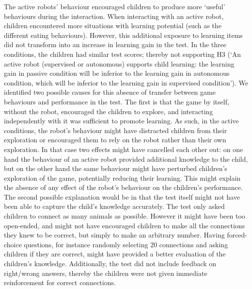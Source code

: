 The active robots' behaviour encouraged children to produce more `useful' behaviours during the interaction. When interacting with an active robot, children encountered more situations with learning potential (such as the different eating behaviours). However, this additional exposure to learning items did not transform into an increase in learning gain in the test. In the three conditions, the children had similar test scores; thereby not supporting H3 (`An active robot (supervised or autonomous) supports child learning: the learning gain in passive condition will be inferior to the learning gain in autonomous condition, which will be inferior to the learning gain in supervised condition'). We identified two possible causes for this absence of transfer between game behaviours and performance in the test. The first is that the game by itself, without the robot, encouraged the children to explore, and interacting independently with it was sufficient to promote learning. As such, in the active conditions, the robot's behaviour might have distracted children from their exploration or encouraged them to rely on the robot rather than their own exploration. In that case two effects might have cancelled each other out: on one hand the behaviour of an active robot provided additional knowledge to the child, but on the other hand the same behaviour might have perturbed children's exploration of the game, potentially reducing their learning. This might explain the absence of any effect of the robot's behaviour on the children's performance. The second possible explanation would be in that the test itself might not have been able to capture the child's knowledge accurately. The test only asked children to connect as many animals as possible. However it might have been too open-ended, and might not have encouraged children to make all the connections they knew to be correct, but simply to make an arbitrary number. %
Having forced-choice questions, for instance randomly selecting 20 connections and asking children if they are correct, might have provided a better evaluation of the children's knowledge. Additionally, the test did not include feedback on right/wrong answers, thereby the children were not given immediate reinforcement for correct connections.


